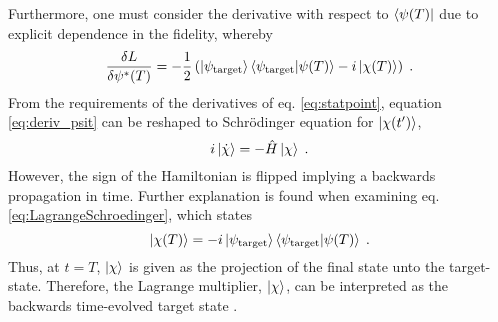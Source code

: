 Furthermore, one must consider the derivative with respect to $\bra{\psi (T)}$ due to explicit dependence in the fidelity, whereby
\begin{equation}
	\frac{\delta L}{\delta \psi ^* (T)} = - \frac{1}{2} \left( \ket{\psi_{\mathrm{target}}} \braket{\psi_{\mathrm{target}} | \psi (T)} - i \ket{\chi (T)} \right) \; . \label{eq:deriv_psiT}
\end{equation}
From the requirements of the derivatives of eq. \eqref{eq:statpoint}, equation \eqref{eq:deriv_psit} can be reshaped to Schrödinger equation for $\ket{\chi (t')}$,
\begin{equation}
	 i \ket{\dot{\chi}} =  - \hat{H} \ket{\chi} \; .
	 \label{eq:LagrangeSchroedinger}
\end{equation}
However, the sign of the Hamiltonian is flipped implying a backwards propagation in time. Further explanation is found when examining eq. \eqref{eq:LagrangeSchroedinger}, which states
\begin{equation}
	 \ket{\chi (T)} = -i \ket{\psi_{\mathrm{target}}} \braket{\psi_{\mathrm{target}} | \psi (T)} \; .
\end{equation}
Thus, at $t = T$, $\ket{\chi}$ is given as the projection of the final state unto the target-state. Therefore, the Lagrange multiplier, $\ket{\chi}$, can be interpreted as the backwards time-evolved target state \cite{BECcontrol}.\\




